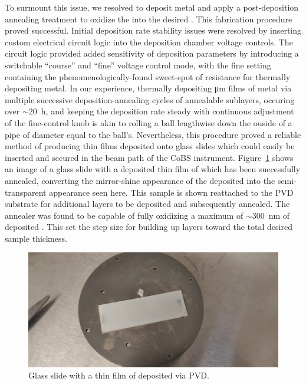 To surmount this issue, we resolved to deposit  metal and apply a post-deposition annealing treatment to oxidize the  into the desired . This fabrication procedure proved successful. Initial deposition rate stability issues were resolved by inserting custom electrical circuit logic into the deposition chamber voltage controls. The circuit logic provided added sensitivity of deposition parameters by introducing a switchable ``course'' and ``fine'' voltage control mode, with the fine setting containing the phenomenologically-found sweet-spot of resistance for thermally depositing  metal. In our experience, thermally depositing \si{\micro\meter} films of  metal via multiple successive deposition-annealing cycles of annealable sublayers, occuring over \(\sim\)\SI{20}{\hour}, and keeping the deposition rate steady with continuous adjustment of the fine-control knob is akin to rolling a ball lengthwise down the ouside of a pipe of diameter equal to the ball's. Nevertheless, this procedure proved a reliable method of producing  thin films deposited onto glass slides which could easily be inserted and secured in the beam path of the \ac{CoBS} instrument. Figure~\ref{fig:Raman:TeO2slide} shows an image of a glass slide with a deposited thin film of  which has been successfully annealed, converting the mirror-shine appearance of the deposited  into the semi-transparent appearance seen here. This sample is shown reattached to the \ac{PVD} substrate for additional layers to be deposited and subsequently annealed. The annealer was found to be capable of fully oxidizing a maximum of \(\sim\)\SI{300}{\nano\meter} of deposited . This set the step size for building up  layers toward the total desired sample thickness.

\begin{figure}[t]
  \centering
  \includegraphics[width=.85\textwidth]{figs/4-Raman/slide-with-TeO2-film-on-substrate.jpeg}
  \caption{Glass slide with a thin film of  deposited via \ac{PVD}.}
  \label{fig:Raman:TeO2slide}
\end{figure}

